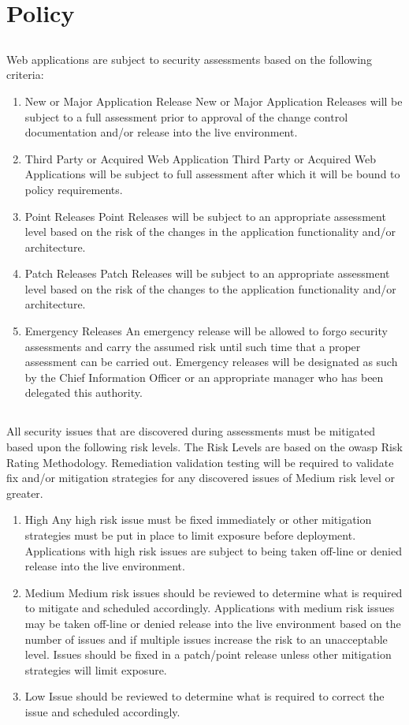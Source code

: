 \section{Policy}
\subsection*{}
Web applications are subject to security assessments based on the following criteria:
\begin{enumerate}
\item{New or Major Application Release}
New or Major Application Releases will be subject to a full assessment prior to approval of the change control documentation and/or release into the live environment.
\item{Third Party or Acquired Web Application}
Third Party or Acquired Web Applications will be subject to full assessment after which it will be bound to policy requirements.
\item{Point Releases}
Point Releases will be subject to an appropriate assessment level based on the risk of the changes in the application functionality and/or architecture.
\item{Patch Releases}
Patch Releases will be subject to an appropriate assessment level based on the risk of the changes to the application functionality and/or architecture.
\item{Emergency Releases}
An emergency release will be allowed to forgo security assessments and carry the assumed risk until such time that a proper assessment can be carried out.  
Emergency releases will be designated as such by the Chief Information Officer or an appropriate manager who has been delegated this authority.
\end{enumerate}
\subsection*{}
All security issues that are discovered during assessments must be mitigated based upon the following risk levels.  
The Risk Levels are based on the \gls{owasp} Risk Rating Methodology.  
Remediation validation testing will be required to validate fix and/or mitigation strategies for any discovered issues of Medium risk level or greater.  
\begin{enumerate}
\item{High}
Any high risk issue must be fixed immediately or other mitigation strategies must be put in place to limit exposure before deployment.  
Applications with high risk issues are subject to being taken off-line or denied release into the live environment.  
\item{Medium}
Medium risk issues should be reviewed to determine what is required to mitigate and scheduled accordingly.  
Applications with medium risk issues may be taken off-line or denied release into the live environment based on the number of issues and if multiple issues increase the risk to an unacceptable level.  
Issues should be fixed in a patch/point release unless other mitigation strategies will limit exposure.
\item{Low}
Issue should be reviewed to determine what is required to correct the issue and scheduled accordingly.
\end{enumerate}
